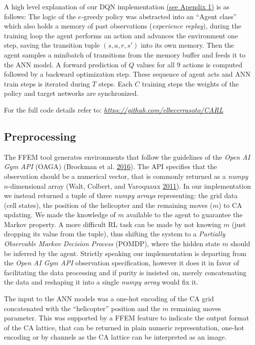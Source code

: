 \documentclass[
  openany]{book}
\begin{document}
A high level explanation of our DQN implementation \protect\hyperlink{deep-q-networks-dqn-using-open-ai-gym-api}{(see Apendix 1)} is as follows: The logic of the \(e\)-greedy policy was abstracted into an ``Agent class'' which also holds a memory of past observations (\emph{experience replay}), during the training loop the agent performs an action and advances the environment one step, saving the transition tuple \((s,a,r,s')\) into its own memory. Then the agent samples a minibatch of transitions from the memory buffer and feeds it to the ANN model. A forward prediction of \(Q\) values for all \(9\) actions is computed followed by a backward optimization step. These sequence of agent acts and ANN train steps is iterated during \(T\) steps. Each \(C\) training steps the weights of the policy and target networks are synchronized.

For the full code details refer to: \emph{\url{https://github.com/elbecerrasoto/CARL}}

\hypertarget{preprocessing}{%
\subsection{Preprocessing}\label{preprocessing}}

The FFEM tool generates environments that follow the guidelines of the \emph{Open AI Gym API} (OAGA) (Brockman et al. \protect\hyperlink{ref-1606.01540}{2016}). The API specifies that the observation should be a numerical vector, that is commonly returned as a \emph{numpy} \(n\)-dimensional array (Walt, Colbert, and Varoquaux \protect\hyperlink{ref-walt2011numpy}{2011}). In our implementation we instead returned a tuple of three \emph{numpy arrays} representing: the grid data (cell states), the position of the helicopter and the remaining moves (\(m\)) to CA updating. We made the knowledge of \(m\) available to the agent to guarantee the Markov property. A more difficult RL task can be made by not knowing \(m\) (just dropping its value from the tuple), thus shifting the system to a \emph{Partially Observable Markov Decision Process} (POMDP), where the hidden state \(m\) should be inferred by the agent. Strictly speaking our implementation is departing from the \emph{Open AI Gym API} observation specification, however it does it in favor of facilitating the data processing and if purity is insisted on, merely concatenating the data and reshaping it into a single \emph{numpy array} would fix it.

The input to the ANN models was a one-hot encoding of the CA grid concatenated with the ``helicopter'' position and the \(m\) remaining moves parameter. This was supported by a FFEM feature to indicate the output format of the CA lattice, that can be returned in plain numeric representation, one-hot encoding or by channels as the CA lattice can be interpreted as an image.
\end{document}
